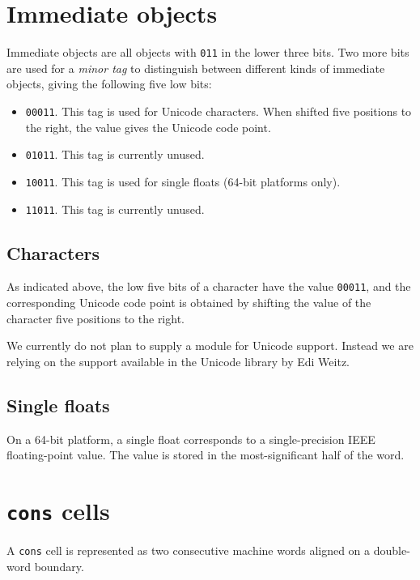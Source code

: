\section{Immediate objects}
\label{sec-data-representation-immediate-objects}

Immediate objects are all objects with \texttt{011} in the lower three
bits.  Two more bits are used for a \emph{minor tag} to distinguish
between different kinds of immediate objects, giving the following
five low bits:

\begin{itemize}
\item \texttt{00011}.  This tag is used for Unicode characters.  When
  shifted five positions to the right, the value gives the Unicode
  code point.
\item \texttt{01011}.  This tag is currently unused.
\item \texttt{10011}.  This tag is used for single floats (64-bit
  platforms only).
\item \texttt{11011}.  This tag is currently unused.
\end{itemize}

\subsection{Characters}

As indicated above, the low five bits of a character have the value
\texttt{00011}, and the corresponding Unicode code point is obtained by
shifting the value of the character five positions to the right.

We currently do not plan to supply a module for Unicode support.
Instead we are relying on the support available in the Unicode library
by Edi Weitz.

\subsection{Single floats}

On a 64-bit platform, a single float corresponds to a single-precision
IEEE floating-point value.  The value is stored in the
most-significant half of the word.

\section{\texttt{cons} cells}
\label{sec-data-representation-cons-cells}

A \texttt{cons} cell is represented as two consecutive machine
words aligned on a double-word boundary.

